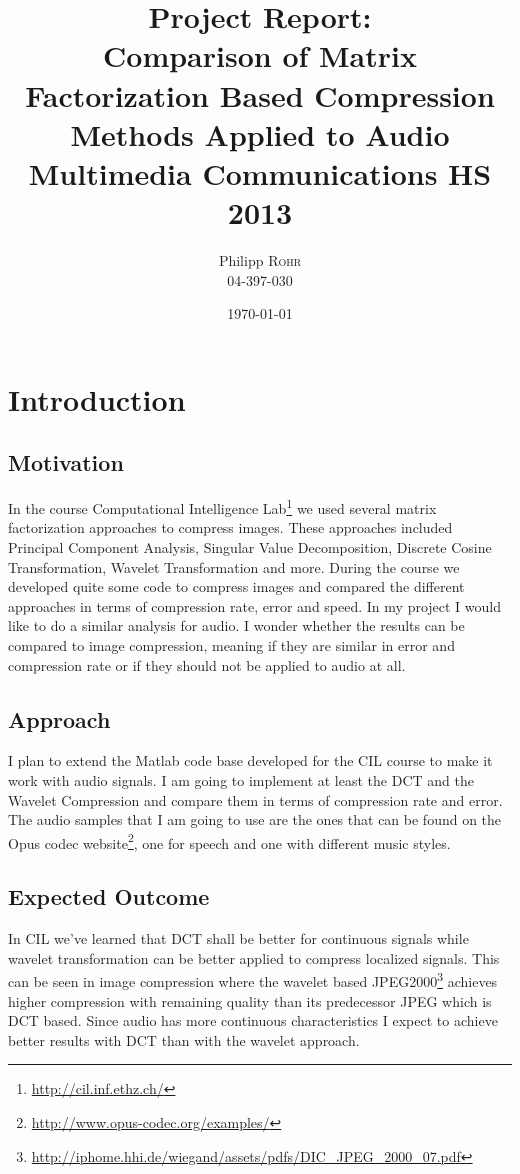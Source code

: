 \documentclass[a4paper]{scrartcl}
\title{Project Report: \\ Comparison of Matrix Factorization Based
Compression Methods Applied to Audio\\ Multimedia Communications HS 2013} %
\author{Philipp \textsc{Rohr} \\ 04-397-030} %
\date{\today} %
\begin{document}
\maketitle %


\section{Introduction}
\subsection{Motivation}

In the course Computational Intelligence Lab\footnote{\url{http://cil.inf.ethz.ch/}}
we used several matrix factorization approaches to compress images. These
approaches included Principal Component Analysis, Singular Value Decomposition,
Discrete Cosine Transformation, Wavelet Transformation and more. During the
course we developed quite some code to compress images and compared the
different approaches in terms of compression rate, error and speed. In my
project I would like to do a similar analysis for audio. I wonder whether the
results can be compared to image compression, meaning if they are similar in
error and compression rate or if they should not be applied to audio at all.


\subsection{Approach} I plan to extend the Matlab code base developed for the CIL
course to make it work with audio signals. I am going to implement at least the
DCT and the Wavelet Compression and compare them in terms of compression rate
and error. The audio samples that I am going to use are the ones that can be
found on the Opus codec website\footnote{\url{http://www.opus-codec.org/examples/}},
one for speech and one with different music styles.


\subsection{Expected Outcome}

In CIL we've learned that DCT shall be better for continuous signals while
wavelet transformation can be better applied to compress localized signals. This
can be seen in image compression where the wavelet based
JPEG2000\footnote{\url{http://iphome.hhi.de/wiegand/assets/pdfs/DIC\_JPEG\_2000\_07.pdf}}
achieves higher compression with remaining quality than its predecessor JPEG
which is DCT based. Since audio has more continuous characteristics I expect to
achieve better results with DCT than with the wavelet approach.
\end{document}

